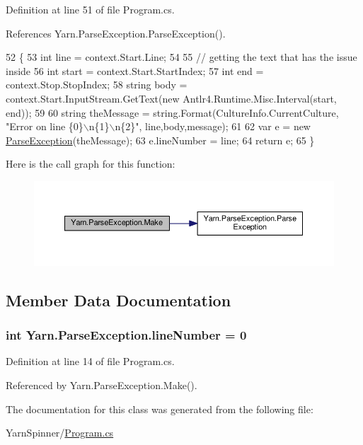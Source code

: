 Definition at line 51 of file Program.\-cs.



References Yarn.\-Parse\-Exception.\-Parse\-Exception().


\begin{DoxyCode}
52         \{
53             \textcolor{keywordtype}{int} line = context.Start.Line;
54 
55             \textcolor{comment}{// getting the text that has the issue inside}
56             \textcolor{keywordtype}{int} start = context.Start.StartIndex;
57             \textcolor{keywordtype}{int} end = context.Stop.StopIndex;
58             \textcolor{keywordtype}{string} body = context.Start.InputStream.GetText(\textcolor{keyword}{new} Antlr4.Runtime.Misc.Interval(start, end));
59 
60             \textcolor{keywordtype}{string} theMessage = string.Format(CultureInfo.CurrentCulture, \textcolor{stringliteral}{"Error on line \{0\}\(\backslash\)n\{1\}\(\backslash\)n\{2\}"}, 
      line,body,message);
61 
62             var e = \textcolor{keyword}{new} \hyperlink{a00149_aa3c4f5c8b0ae86097bbc46044df9f317}{ParseException}(theMessage);
63             e.lineNumber = line;
64             \textcolor{keywordflow}{return} e;
65         \}
\end{DoxyCode}


Here is the call graph for this function\-:
\nopagebreak
\begin{figure}[H]
\begin{center}
\leavevmode
\includegraphics[width=350pt]{a00149_a0265905b09fbd675d40c452d9fc61207_cgraph}
\end{center}
\end{figure}




\subsection{Member Data Documentation}
\hypertarget{a00149_ab335169367e64fd6d89d58b3ac573751}{
\subsubsection[{line\-Number}]{\setlength{\rightskip}{0pt plus 5cm}int Yarn.\-Parse\-Exception.\-line\-Number = 0\hspace{0.3cm}{\ttfamily [package]}}}\label{a00149_ab335169367e64fd6d89d58b3ac573751}


Definition at line 14 of file Program.\-cs.



Referenced by Yarn.\-Parse\-Exception.\-Make().



The documentation for this class was generated from the following file\-:\begin{DoxyCompactItemize}
\item 
Yarn\-Spinner/\hyperlink{a00317}{Program.\-cs}\end{DoxyCompactItemize}
